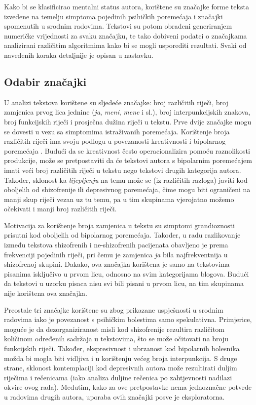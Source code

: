 \documentclass[10pt, a4paper]{article}
\begin{document}
Kako bi se klasificirao mentalni status autora, korištene su značajke forme teksta izvedene na temelju simptoma pojedinih psihičkih poremećaja i značajki spomenutih u srodnim radovima. Tekstovi su potom obrađeni generiranjem numeričke vrijednosti za svaku značajku, te tako dobiveni podatci o značajkama analizirani različitim algoritmima kako bi se mogli usporediti rezultati. Svaki od navedenih koraka detaljnije je opisan u nastavku.

\subsection{Odabir značajki}

U analizi tekstova korištene su sljedeće značajke: broj različitih riječi, broj zamjenica prvog lica jednine (\emph{ja}, \emph{meni}, \emph{mene} i sl.), broj interpunkcijskih znakova, broj funkcijskih riječi i prosječna dužina riječi u tekstu. Prve dvije značajke mogu se dovesti u vezu sa simptomima istraživanih poremećaja. Korištenje broja različitih riječi ima svoju podlogu u povezanosti kreativnosti i bipolarnog poremećaja \citep{crea}. Budući da se kreativnost često operacionalizira pomoću raznolikosti produkcije, može se pretpostaviti da će tekstovi autora s bipolarnim poremećajem imati veći broj različitih riječi u tekstu nego tekstovi drugih kategorija autora. Također, sklonost ka \emph{lijepljenju} na temu može se (iz različitih razloga) javiti kod oboljelih od shizofrenije ili depresivnog poremećaja, čime mogu biti ograničeni na manji skup riječi vezan uz tu temu, pa u tim skupinama vjerojatno možemo očekivati i manji broj različitih riječi.

Motivacija za korištenje broja zamjenica u tekstu su simptomi grandioznosti prisutni kod oboljelih od bipolarnog poremećaja. Također, u radu \citep{strous-2009} razlikovanje između tekstova shizofrenih i ne-shizofrenih pacijenata obavljeno je prema frekvenciji pojedinih riječi, pri čemu je zamjenica \emph{ja} bila najfrekventnija u shizofrenoj skupini. Dakako, ova značajka korištena je samo na tekstovima pisanima isključivo u prvom licu, odnosno na svim kategorijama blogova. Budući da tekstovi u uzorku pisaca nisu svi bili pisani u prvom licu, na tim skupinama nije korištena ova značajka.

Preostale tri značajke korištene su zbog prikazane uspješnosti u srodnim radovima \citep{kristo} iako je povezanost s psihičkim bolestima samo spekulativna. Primjerice, moguće je da dezorganiziranost misli kod shizofrenije rezultira različitom količinom određenih sadržaja u tekstovima, što se može očitovati na broju funkcijskih riječi. Također, ekspresivnost i ubrzanost kod bipolarnih bolesnika možda bi mogla biti vidljiva i u korištenju većeg broja interpunkcija. S druge strane, sklonost kontemplaciji kod depresivnih autora može rezultirati duljim riječima i rečenicama (iako analiza duljine rečenica po zahtjevnosti nadilazi okvire ovog rada). Međutim, kako za ove pretpostavke nema jednoznačne potvrde u radovima drugih autora, uporaba ovih značajki posve je eksploratorna.
\end{document}
